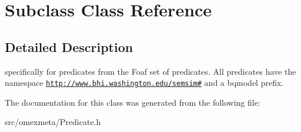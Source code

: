 \hypertarget{classSubclass}{}\section{Subclass Class Reference}
\label{classSubclass}


\subsection{Detailed Description}
specifically for predicates from the Foaf set of predicates. All predicates have the namespace {\ttfamily \href{http://www.bhi.washington.edu/semsim#}{\tt http\+://www.\+bhi.\+washington.\+edu/semsim\#}} and a {\ttfamily bqmodel} prefix. 

The documentation for this class was generated from the following file\+:\begin{DoxyCompactItemize}
\item 
src/omexmeta/Predicate.\+h\end{DoxyCompactItemize}
